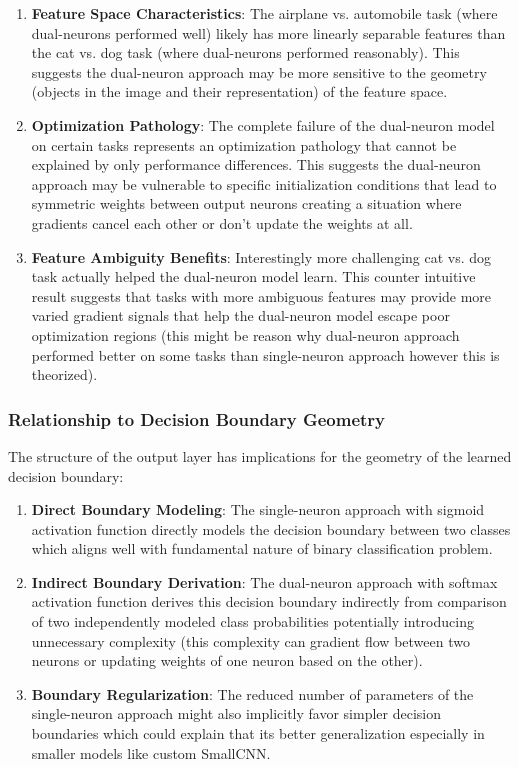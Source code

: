 \begin{enumerate}
\item \textbf{Feature Space Characteristics}: The airplane vs. automobile task (where dual-neurons performed well) likely has more linearly separable features than the cat vs. dog task (where dual-neurons performed reasonably). This suggests the dual-neuron approach may be more sensitive to the geometry (objects in the image and their representation) of the feature space.

\item \textbf{Optimization Pathology}: The complete failure of the dual-neuron model on certain tasks represents an optimization pathology that cannot be explained by only performance differences. This suggests the dual-neuron approach may be vulnerable to specific initialization conditions that lead to symmetric weights between output neurons creating a situation where gradients cancel each other or don't update the weights at all.

\item \textbf{Feature Ambiguity Benefits}: Interestingly more challenging cat vs. dog task actually helped the dual-neuron model learn. This counter intuitive result suggests that tasks with more ambiguous features may provide more varied gradient signals that help the dual-neuron model escape poor optimization regions (this might be reason why dual-neuron approach performed better on some tasks than single-neuron approach however this is theorized).
\end{enumerate}

\subsubsection{Relationship to Decision Boundary Geometry}

The structure of the output layer has implications for the geometry of the learned decision boundary:

\begin{enumerate}
\item \textbf{Direct Boundary Modeling}: The single-neuron approach with sigmoid activation function directly models the decision boundary between two classes which aligns well with fundamental nature of binary classification problem.

\item \textbf{Indirect Boundary Derivation}: The dual-neuron approach with softmax activation function derives this decision boundary indirectly from comparison of two independently modeled class probabilities potentially introducing unnecessary complexity (this complexity can gradient flow between two neurons or updating weights of one neuron based on the other).

\item \textbf{Boundary Regularization}: The reduced number of parameters of the single-neuron approach might also implicitly favor simpler decision boundaries which could explain that its better generalization especially in smaller models like custom SmallCNN.
\end{enumerate}

